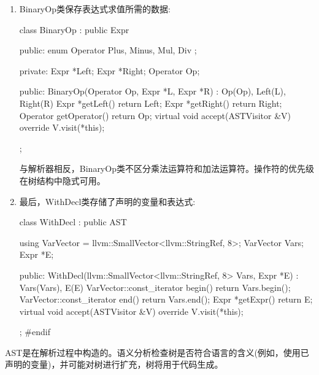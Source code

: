 \begin{enumerate}
\item
BinaryOp类保存表达式求值所需的数据:

\begin{cpp}
class BinaryOp : public Expr {
public:
    enum Operator { Plus, Minus, Mul, Div };

private:
    Expr *Left;
    Expr *Right;
    Operator Op;

public:
    BinaryOp(Operator Op, Expr *L, Expr *R)
        : Op(Op), Left(L), Right(R) {}
    Expr *getLeft() { return Left; }
    Expr *getRight() { return Right; }
    Operator getOperator() { return Op; }
    virtual void accept(ASTVisitor &V) override {
        V.visit(*this);
    }
};
\end{cpp}

与解析器相反，BinaryOp类不区分乘法运算符和加法运算符。操作符的优先级在树结构中隐式可用。

\item
最后，WithDecl类存储了声明的变量和表达式:

\begin{cpp}
class WithDecl : public AST {
    using VarVector =
        llvm::SmallVector<llvm::StringRef, 8>;
    VarVector Vars;
    Expr *E;

public:
    WithDecl(llvm::SmallVector<llvm::StringRef, 8> Vars,
            Expr *E)
        : Vars(Vars), E(E) {}
    VarVector::const_iterator begin()
                                { return Vars.begin(); }
    VarVector::const_iterator end() { return Vars.end(); }
    Expr *getExpr() { return E; }
    virtual void accept(ASTVisitor &V) override {
        V.visit(*this);
    }
};
#endif
\end{cpp}

\end{enumerate}

AST是在解析过程中构造的。语义分析检查树是否符合语言的含义(例如，使用已声明的变量)，并可能对树进行扩充，树将用于代码生成。